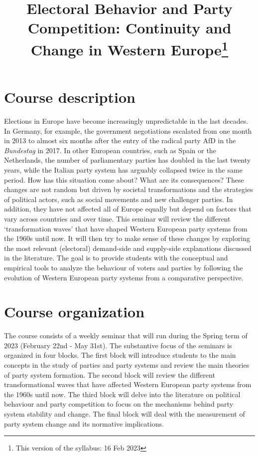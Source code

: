 \documentclass[
  12pt,
]{article}
\title{Electoral Behavior and Party Competition: Continuity and Change
in Western Europe\footnote{This version of the syllabus: 16 Feb 2023}\\
\vspace{15truemm}}
\subtitle{Masterseminar Spring 2023

Wednesdays 14:15-16:00

Classroom HS12\footnote{Sessions 5 and 6 will take place in room 3.A05
  on Wednesday, 22nd March, from 13:30 to 17:00.}}
\author{}
\date{\vspace{-2.5em}}
\begin{document}
\maketitle

\hypertarget{course-description}{%
\section{Course description}\label{course-description}}

Elections in Europe have become increasingly unpredictable in the last
decades. In Germany, for example, the government negotiations escalated
from one month in 2013 to almost six months after the entry of the
radical party AfD in the \emph{Bundestag} in 2017. In other European
countries, such as Spain or the Netherlands, the number of parliamentary
parties has doubled in the last twenty years, while the Italian party
system has arguably collapsed twice in the same period. How has this
situation come about? What are its consequences? These changes are not
random but driven by societal transformations and the strategies of
political actors, such as social movements and new challenger parties.
In addition, they have not affected all of Europe equally but depend on
factors that vary across countries and over time. This seminar will
review the different `transformation waves' that have shaped Western
European party systems from the 1960s until now. It will then try to
make sense of these changes by exploring the most relevant (electoral)
demand-side and supply-side explanations discussed in the literature.
The goal is to provide students with the conceptual and empirical tools
to analyze the behaviour of voters and parties by following the
evolution of Western European party systems from a comparative
perspective.

\hypertarget{course-organization}{%
\section{Course organization}\label{course-organization}}

The course consists of a weekly seminar that will run during the Spring
term of 2023 (February 22nd - May 31st). The substantive focus of the
seminars is organized in four blocks. The first block will introduce
students to the main concepts in the study of parties and party systems
and review the main theories of party system formation. The second block
will review the different transformational waves that have affected
Western European party systems from the 1960s until now. The third block
will delve into the literature on political behaviour and party
competition to focus on the mechanisms behind party system stability and
change. The final block will deal with the measurement of party system
change and its normative implications.
\end{document}
